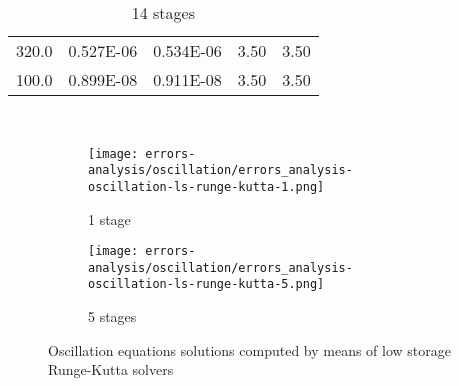 \begin{table}[!ht]
\begin{subtable}[b]{0.40\textwidth}
{\begin{tabular}{ccccc}
       320.0          &  0.527E-06    &  0.534E-06    & 3.50          & 3.50          \\
       100.0          &  0.899E-08    &  0.911E-08    & 3.50          & 3.50          \\
      \bottomrule
    \end{tabular}}
  \end{subtable}\\
  \begin{subtable}[b]{0.40\textwidth}
    \centering
    \caption{14 stages}\label{tab:oscillation-ls-rk-14}
  \end{subtable}\quad%
\end{table}

\begin{figure}[!ht]
  \centering
  \begin{subfigure}[b]{0.45\textwidth}
    \centering
    \texttt{[image: errors-analysis/oscillation/errors\_analysis-oscillation-ls-runge-kutta-1.png]}
    \caption{1 stage}\label{fig:results-oscillation-ls-runge-kutta-1}
  \end{subfigure}\quad%
  \begin{subfigure}[b]{0.45\textwidth}
    \centering
    \texttt{[image: errors-analysis/oscillation/errors\_analysis-oscillation-ls-runge-kutta-5.png]}
    \caption{5 stages}\label{fig:results-oscillation-ls-runge-kutta-5}
  \end{subfigure}
  \caption{Oscillation equations solutions computed by means of low storage Runge-Kutta solvers}\label{fig:results-oscillation-ls-runge-kutta-1-5}
\end{figure}

